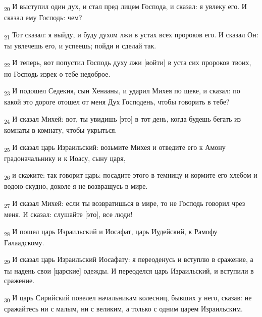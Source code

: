 \begin{tcolorbox}
\textsubscript{20} И выступил один дух, и стал пред лицем Господа, и сказал: я увлеку его. И сказал ему Господь: чем?
\end{tcolorbox}
\begin{tcolorbox}
\textsubscript{21} Тот сказал: я выйду, и буду духом лжи в устах всех пророков его. И сказал Он: ты увлечешь его, и успеешь; пойди и сделай так.
\end{tcolorbox}
\begin{tcolorbox}
\textsubscript{22} И теперь, вот попустил Господь духу лжи [войти] в уста сих пророков твоих, но Господь изрек о тебе недоброе.
\end{tcolorbox}
\begin{tcolorbox}
\textsubscript{23} И подошел Седекия, сын Хенааны, и ударил Михея по щеке, и сказал: по какой это дороге отошел от меня Дух Господень, чтобы говорить в тебе?
\end{tcolorbox}
\begin{tcolorbox}
\textsubscript{24} И сказал Михей: вот, ты увидишь [это] в тот день, когда будешь бегать из комнаты в комнату, чтобы укрыться.
\end{tcolorbox}
\begin{tcolorbox}
\textsubscript{25} И сказал царь Израильский: возьмите Михея и отведите его к Амону градоначальнику и к Иоасу, сыну царя,
\end{tcolorbox}
\begin{tcolorbox}
\textsubscript{26} и скажите: так говорит царь: посадите этого в темницу и кормите его хлебом и водою скудно, доколе я не возвращусь в мире.
\end{tcolorbox}
\begin{tcolorbox}
\textsubscript{27} И сказал Михей: если ты возвратишься в мире, то не Господь говорил чрез меня. И сказал: слушайте [это], все люди!
\end{tcolorbox}
\begin{tcolorbox}
\textsubscript{28} И пошел царь Израильский и Иосафат, царь Иудейский, к Рамофу Галаадскому.
\end{tcolorbox}
\begin{tcolorbox}
\textsubscript{29} И сказал царь Израильский Иосафату: я переоденусь и вступлю в сражение, а ты надень свои [царские] одежды. И переоделся царь Израильский, и вступили в сражение.
\end{tcolorbox}
\begin{tcolorbox}
\textsubscript{30} И царь Сирийский повелел начальникам колесниц, бывших у него, сказав: не сражайтесь ни с малым, ни с великим, а только с одним царем Израильским.
\end{tcolorbox}
